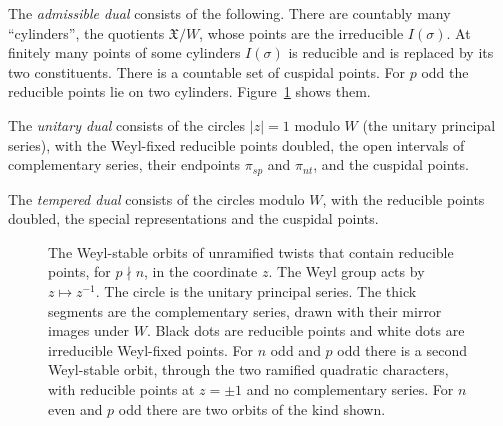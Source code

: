 \documentclass[12pt,letterpaper]{article}
\numberwithin{equation}{section}
\theoremstyle{definition}
\newcommand{\fX}{\mathfrak X}
\DeclareMathOperator{\re}{Re}
\begin{document}
The \emph{admissible dual} consists of the following.  There are countably many
``cylinders'', the quotients $\fX/W$, whose points are the irreducible $I(\sigma)$.  At
finitely many points of some cylinders $I(\sigma)$ is reducible and is replaced by its two
constituents.  There is a countable set of cuspidal points.  For $p$ odd the reducible
points lie on two cylinders.  Figure~\ref{fig:dual} shows them.

The \emph{unitary dual} consists of the circles $|z|=1$ modulo $W$ (the unitary principal
series), with the Weyl-fixed reducible points doubled, the open intervals of
complementary series, their endpoints $\pi_{sp}$ and $\pi_{nt}$, and the cuspidal points.

The \emph{tempered dual} consists of the circles modulo $W$, with the reducible points
doubled, the special representations and the cuspidal points.

\begin{figure}[ht]
\centering
{}
\caption{The Weyl-stable orbits of unramified twists that contain reducible points, for
$p\nmid n$, in the coordinate $z$.  The Weyl group acts by $z\mapsto z^{-1}$.  The circle
is the unitary principal series.  The thick segments are the complementary series, drawn
with their mirror images under $W$.  Black dots are reducible points and white dots are
irreducible Weyl-fixed points.  For $n$ odd and $p$ odd there is a second Weyl-stable
orbit, through the two ramified quadratic characters, with reducible points at $z=\pm1$
and no complementary series.  For $n$ even and $p$ odd there are two orbits of the kind
shown.}\label{fig:dual}
\end{figure}
\end{document}
